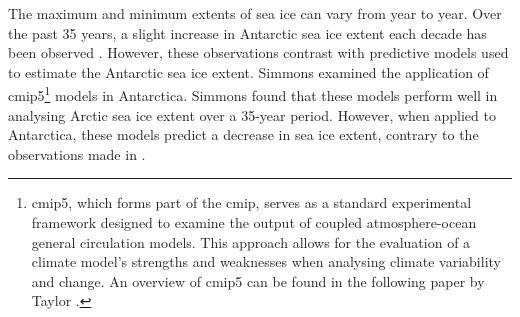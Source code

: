 

The maximum and minimum extents of sea ice can vary from year to year. Over the past 35 years,  a slight increase in Antarctic sea ice extent each decade has been observed \cite{Comiso2017,Maksym2012,Simmonds2015}. However, these observations contrast with predictive models used to estimate the Antarctic sea ice extent. Simmons \cite{Simmonds2015} examined the application of \ac{cmip5}\footnote{\acs{cmip5}, which forms part of the \ac{cmip}, serves as a standard experimental framework designed to examine the output of coupled atmosphere-ocean general circulation models. This approach allows for the evaluation of a climate model's strengths and weaknesses when analysing climate variability and change. An overview of \acs{cmip5} can be found in the following paper by Taylor \cite{Taylor2012}.} models in Antarctica. Simmons found that these models perform well in analysing Arctic sea ice extent over a 35-year period. However, when applied to Antarctica, these models predict a decrease in sea ice extent, contrary to the observations made in \cite{Comiso2017,Maksym2012}.



